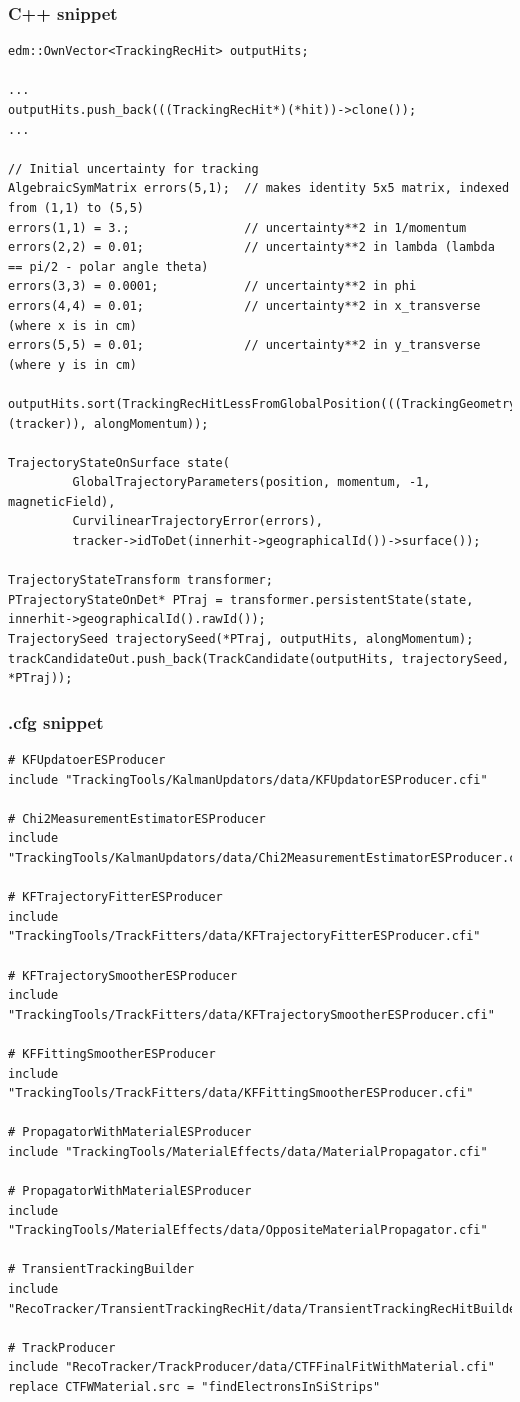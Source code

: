\documentclass[12pt,compress]{beamer}
\begin{document}
\begin{frame}[fragile]
\frametitle{C++ snippet}
\tiny
\begin{verbatim}
edm::OwnVector<TrackingRecHit> outputHits;

...
outputHits.push_back(((TrackingRecHit*)(*hit))->clone());
...

// Initial uncertainty for tracking
AlgebraicSymMatrix errors(5,1);  // makes identity 5x5 matrix, indexed from (1,1) to (5,5)
errors(1,1) = 3.;                // uncertainty**2 in 1/momentum
errors(2,2) = 0.01;              // uncertainty**2 in lambda (lambda == pi/2 - polar angle theta)
errors(3,3) = 0.0001;            // uncertainty**2 in phi
errors(4,4) = 0.01;              // uncertainty**2 in x_transverse (where x is in cm)
errors(5,5) = 0.01;              // uncertainty**2 in y_transverse (where y is in cm)

outputHits.sort(TrackingRecHitLessFromGlobalPosition(((TrackingGeometry*)(tracker)), alongMomentum));

TrajectoryStateOnSurface state(
         GlobalTrajectoryParameters(position, momentum, -1, magneticField),
         CurvilinearTrajectoryError(errors),
         tracker->idToDet(innerhit->geographicalId())->surface());

TrajectoryStateTransform transformer;
PTrajectoryStateOnDet* PTraj = transformer.persistentState(state, innerhit->geographicalId().rawId());
TrajectorySeed trajectorySeed(*PTraj, outputHits, alongMomentum);
trackCandidateOut.push_back(TrackCandidate(outputHits, trajectorySeed, *PTraj));
\end{verbatim}
\end{frame}

\begin{frame}[fragile]
\frametitle{.cfg snippet}
\tiny
\begin{verbatim}
# KFUpdatoerESProducer
include "TrackingTools/KalmanUpdators/data/KFUpdatorESProducer.cfi"

# Chi2MeasurementEstimatorESProducer
include "TrackingTools/KalmanUpdators/data/Chi2MeasurementEstimatorESProducer.cfi"

# KFTrajectoryFitterESProducer
include "TrackingTools/TrackFitters/data/KFTrajectoryFitterESProducer.cfi"

# KFTrajectorySmootherESProducer
include "TrackingTools/TrackFitters/data/KFTrajectorySmootherESProducer.cfi"

# KFFittingSmootherESProducer
include "TrackingTools/TrackFitters/data/KFFittingSmootherESProducer.cfi"

# PropagatorWithMaterialESProducer
include "TrackingTools/MaterialEffects/data/MaterialPropagator.cfi"

# PropagatorWithMaterialESProducer
include "TrackingTools/MaterialEffects/data/OppositeMaterialPropagator.cfi"

# TransientTrackingBuilder
include "RecoTracker/TransientTrackingRecHit/data/TransientTrackingRecHitBuilder.cfi"

# TrackProducer
include "RecoTracker/TrackProducer/data/CTFFinalFitWithMaterial.cfi"
replace CTFWMaterial.src = "findElectronsInSiStrips"
\end{verbatim}
\end{frame}
\end{document}
